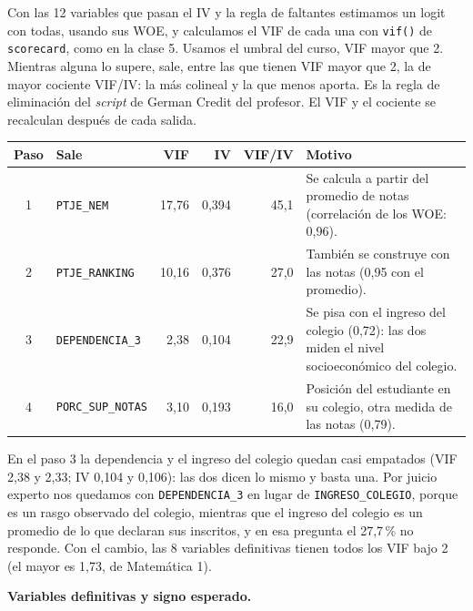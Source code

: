 \documentclass[11pt]{article}
\begin{document}
Con las 12 variables que pasan el IV y la regla de faltantes estimamos un logit con todas, usando sus WOE, y calculamos el VIF de cada
una con \texttt{vif()} de \texttt{scorecard}, como en la clase 5. Usamos el
umbral del curso, VIF mayor que 2. Mientras alguna lo supere, sale, entre
las que tienen VIF mayor que 2, la de mayor cociente VIF/IV: la más colineal
y la que menos aporta. Es la regla de eliminación del \textit{script} de
German Credit del profesor. El VIF y el cociente se
recalculan después de cada salida.

\begin{center}
\begin{tabular}{c>{\raggedright\arraybackslash}p{3.3cm}rrr>{\raggedright\arraybackslash}p{5.4cm}}
\toprule
\textbf{Paso} & \textbf{Sale} & \textbf{VIF} & \textbf{IV} & \textbf{VIF/IV} & \textbf{Motivo} \\
\midrule
1 & \texttt{PTJE\_NEM}       & 17,76 & 0,394 & 45,1 & Se calcula a partir del promedio de notas (correlación de los WOE: 0,96). \\
2 & \texttt{PTJE\_RANKING}   & 10,16 & 0,376 & 27,0 & También se construye con las notas (0,95 con el promedio). \\
3 & \texttt{DEPENDENCIA\_3} & 2,38 & 0,104 & 22,9 & Se pisa con el ingreso del colegio (0,72): las dos miden el nivel socioeconómico del colegio. \\
4 & \texttt{PORC\_SUP\_NOTAS} & 3,10 & 0,193 & 16,0 & Posición del estudiante en su colegio, otra medida de las notas (0,79). \\
\bottomrule
\end{tabular}
\end{center}

En el paso 3 la dependencia y el ingreso del colegio quedan casi
empatados (VIF 2,38 y 2,33; IV 0,104 y 0,106): las dos dicen lo mismo y
basta una. Por juicio experto nos quedamos con \texttt{DEPENDENCIA\_3} en
lugar de \texttt{INGRESO\_COLEGIO}, porque es un rasgo observado del
colegio, mientras que el ingreso del colegio es un promedio de lo que
declaran sus inscritos, y en esa pregunta el 27,7\,\% no responde. Con el
cambio, las 8 variables definitivas tienen todos los VIF bajo 2 (el mayor
es 1,73, de Matemática 1).

\textbf{Variables definitivas y signo esperado.}
\end{document}
